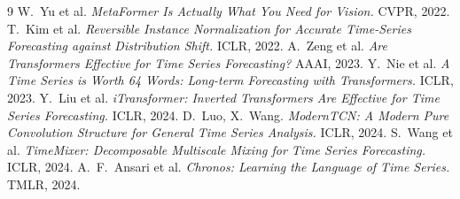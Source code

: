 \documentclass[11pt]{article}
\begin{document}
\begin{thebibliography}{9}
\small
{} W.~Yu et al. \emph{MetaFormer Is Actually What You Need for Vision.} CVPR, 2022.
 T.~Kim et al. \emph{Reversible Instance Normalization for Accurate Time-Series Forecasting against Distribution Shift.} ICLR, 2022.
 A.~Zeng et al. \emph{Are Transformers Effective for Time Series Forecasting?} AAAI, 2023.
 Y.~Nie et al. \emph{A Time Series is Worth 64 Words: Long-term Forecasting with Transformers.} ICLR, 2023.
 Y.~Liu et al. \emph{iTransformer: Inverted Transformers Are Effective for Time Series Forecasting.} ICLR, 2024.
 D.~Luo, X.~Wang. \emph{ModernTCN: A Modern Pure Convolution Structure for General Time Series Analysis.} ICLR, 2024.
 S.~Wang et al. \emph{TimeMixer: Decomposable Multiscale Mixing for Time Series Forecasting.} ICLR, 2024.
 A.~F.~Ansari et al. \emph{Chronos: Learning the Language of Time Series.} TMLR, 2024.
\end{thebibliography}
\end{document}
